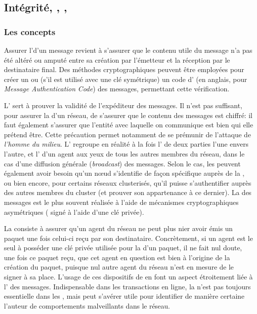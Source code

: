 \subsection{Intégrité, , , }

    \subsubsection{Les concepts}
Assurer l'\integrite d'un message revient à s'assurer que le contenu utile du message n'a pas été altéré ou amputé entre sa création par l'émetteur et la réception par le destinataire final.
Des méthodes cryptographiques peuvent être employées pour créer un  ou (s'il est utilisé avec une clé symétrique) un code d' (\macc en anglais, pour \textit{Message Authentication Code}) des messages, permettant cette vérification.

L' sert à prouver la validité de l'expéditeur des messages.
Il n'est pas suffisant, pour assurer la \secu d'un réseau, de s'assurer que le contenu des messages est chiffré: il faut également s'assurer que l'entité avec laquelle on communique est bien qui elle prétend être.
Cette précaution permet notamment de se prémunir de l'attaque de \textit{l'homme du milieu}.
L' regroupe en réalité à la fois l' de deux parties l'une envers l'autre, et l' d'un agent aux yeux de tous les autres membres du réseau, dans le cas d'une diffusion générale (\textit{broadcast}) des messages.
Selon le cas, les \rcs peuvent également avoir besoin qu'un nœud s'identifie de façon spécifique auprès de la \sdb, ou bien encore, pour certains réseaux clusterisés, qu'il puisse s'authentifier auprès des autres membres du cluster (et prouver son appartenance à ce dernier).
La  des messages est le plus souvent réalisée à l'aide de mécanismes cryptographiques asymétriques ( signé à l'aide d'une clé privée).

La  consiste à assurer qu'un agent du réseau ne peut plus nier avoir émis un paquet une fois celui-ci reçu par son destinataire.
Concrètement, si un agent est le seul à posséder une clé privée utilisée pour la  d'un paquet, il ne fait nul doute, une fois ce paquet reçu, que cet agent en question est bien à l'origine de la création du paquet, puisque nul autre agent du réseau n'est en mesure de le signer à sa place.
L'usage de ces dispositifs de  en font un aspect étroitement liée à l' des messages.
Indispensable dans les transactions en ligne, la  n'est pas toujours essentielle dans les \rcs, mais peut s'avérer utile pour identifier de manière certaine l'auteur de comportements malveillants dans le réseau.

